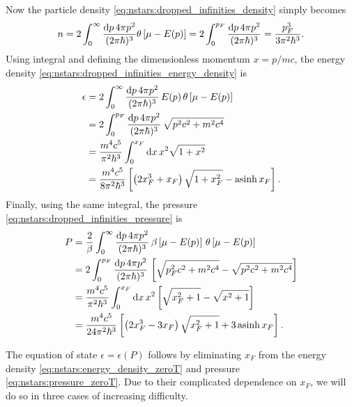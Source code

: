 Now the particle density \eqref{eq:nstars:dropped_infinities_density} simply becomes
\begin{equation}
	n = 
	2 \int_0^\infty \frac{\mathop{}\!\mathrm{d} p \, 4 \pi p^2}{(2 \pi \hbar)^3} \theta \left[ \mu - E(p) \right] =
	2 \int_0^{p_F} \frac{\mathop{}\!\mathrm{d} p \, 4 \pi p^2}{(2 \pi \hbar)^3} = \frac{p_F^3}{3 \pi^2 \hbar^3} .
\label{eq:nstars:density_zeroT}
\end{equation}
Using integral  and defining the dimensionless momentum $x = p / mc$, the energy density \eqref{eq:nstars:dropped_infinities_energy_density} is
\begin{equation}
\begin{split}
	\epsilon &=  2 \int_0^\infty \frac{\mathop{}\!\mathrm{d} p \, 4 \pi p^2}{(2 \pi \hbar)^3} \, E(p) \, \theta \left[ \mu - E(p) \right] \\
	         &=  2 \int_0^{p_F} \frac{\mathop{}\!\mathrm{d} p \, 4 \pi p^2}{(2 \pi \hbar)^3} \, \sqrt{p^2 c^2 + m^2 c^4} \\
	         &= \frac{m^4 c^5}{\pi^2 \hbar^3} \int_0^{x_F} \mathop{}\!\mathrm{d} x \, x^2 \sqrt{1 + x^2} \\
	         &= \frac{m^4 c^5}{8 \pi^2 \hbar^3} \left[ \left( 2 x_F^3 + x_F \right) \sqrt{1 + x_F^2} - \operatorname{asinh} x_F \right] . \\
\end{split}
\label{eq:nstars:energy_density_zeroT}
\end{equation}
Finally, using the same integral, the pressure \eqref{eq:nstars:dropped_infinities_pressure} is
\begin{equation}
\begin{split}
	P &= \frac{2}{\beta} \int_0^\infty \frac{\mathop{}\!\mathrm{d} p \, 4 \pi p^2}{(2 \pi \hbar)^3} \, \beta \left[ \mu - E(p) \right] \, \theta \left[ \mu - E(p) \right] \\
	  &= 2 \int_0^{p_F} \frac{\mathop{}\!\mathrm{d} p \, 4 \pi p^2}{(2 \pi \hbar)^3} \, \left[ \sqrt{p_F^2 c^2 + m^2 c^4} - \sqrt{p^2 c^2 + m^2 c^4} \right] \\
	  &= \frac{m^4 c^5}{\pi^2 \hbar^3} \int_0^{x_F} \mathop{}\!\mathrm{d} x \, x^2 \left[ \sqrt{x_F^2+1} - \sqrt{x^2+1} \right] \\
	  &= \frac{m^4 c^5}{24 \pi^2 \hbar^3} \left[ \left( 2 x_F^3 - 3 x_F \right) \sqrt{x_F^2 + 1} + 3 \operatorname{asinh} x_F \right] . \\
\end{split}
\label{eq:nstars:pressure_zeroT}
\end{equation}

The equation of state $\epsilon = \epsilon(P)$ follows by eliminating $x_F$ from the energy density \eqref{eq:nstars:energy_density_zeroT} and pressure \eqref{eq:nstars:pressure_zeroT}.
Due to their complicated dependence on $x_F$, we will do so in three cases of increasing difficulty.


